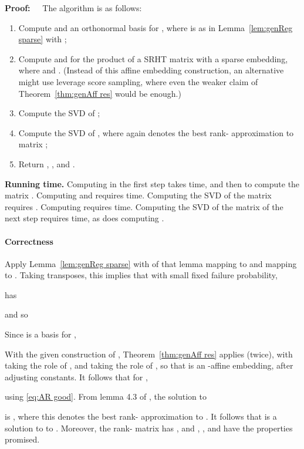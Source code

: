 \documentclass{sig-alternate}
\def\FullBox{\hbox{\vrule width 8pt height 8pt depth 0pt}}
\def\qed{\ifmmode\qquad\FullBox\else{\unskip\nobreak\hfil
\penalty50\hskip1em\null\nobreak\hfil\FullBox
\parfillskip=0pt\finalhyphendemerits=0\endgraf}\fi}
\newenvironment{proof}{\begin{trivlist} \item {\bf Proof:~~}}
  {\qed\end{trivlist}}
\begin{document}
\begin{proof}
The algorithm is as follows:
\begin{enumerate}
\item Compute  and an orthonormal basis  for ,
	where  is as in Lemma~\ref{lem:genReg sparse} with ;
\item Compute  and  for  the product of a 
SRHT matrix with a  sparse embedding,
where 
and .
(Instead of this affine embedding construction,
an alternative might use leverage score sampling,
where even the weaker claim of Theorem~\ref{thm:genAff res}
would be enough.)
\item Compute the SVD of ;
\item Compute the SVD  of ,
	where again  denotes the best rank- approximation to matrix ;
\item Return , , and .
\end{enumerate}

{\bf Running time.}
Computing  in the first step takes
 time,
and then  to compute the 
matrix . 
Computing  and  requires
 time.
Computing the SVD of
the   matrix 
requires . Computing 
requires  time.
Computing the SVD of the
 matrix of the next step requires
 time, as does computing .

\paragraph{Correctness}
Apply Lemma~\ref{lem:genReg sparse} with  of that lemma
mapping to  and  mapping to .
Taking transposes, this implies that with small fixed failure probability,

has

and so

Since  is a basis for ,

With the given construction of ,
Theorem~\ref{thm:genAff res} applies (twice), with  taking the role
of , and  taking the role of , so that  is
an -affine embedding, after adjusting constants.
It follows that
for ,

using \eqref{eq:AR good}.
From lemma 4.3 of \cite{cw09},
the solution to

is , where this denotes the best rank-
approximation to .
It follows that  is a solution to
to .
Moreover, the rank- matrix 
has ,
and , , and  have the properties promised.
\end{proof}
\end{document}
